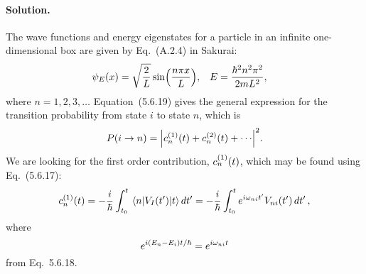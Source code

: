 \documentclass[11pt]{article}
\newcommand{\beq}{\begin{equation*}}
\newcommand{\eeq}{\end{equation*}}
\newenvironment{solution}
{
    \paragraph{Solution.}
    \ignorespaces
}
{
}
\begin{document}
\begin{solution}
	The wave functions and energy eigenstates for a particle in an infinite one-dimensional box are given by Eq.~(A.2.4) in Sakurai:
	\begin{align*}
		\psi_E(x) &= \sqrt{\frac{2}{L}} \sin(\frac{n \pi x}{L}), &
		E &= \frac{\hbar^2 n^2 \pi^2}{2 m L^2},
	\end{align*}
	where $n = 1, 2, 3, \ldots$  Equation~(5.6.19) gives the general expression for the transition probability from state $i$ to state $n$, which is
	\beq
		P(i \to n) = \abs{\cnqt + c_n^{(2)}(t) + \cdots}^2.
	\eeq
	We are looking for the first order contribution, $c_n^{(1)}(t)$, which may be found using Eq.~(5.6.17):
	\beq
		\cnqt = -\frac{i}{\hbar} \inttot \mel{n}{V_I(t')}{t} \dtp
		= -\frac{i}{\hbar} \inttot e^{i \omgni t'} V_{n i}(t') \dtp,
	\eeq
	where
	\beq
		e^{i (E_n - E_i) t / \hbar} = e^{i \omgni t}
	\eeq
	from Eq.~5.6.18.
	

\end{solution}
\end{document}
